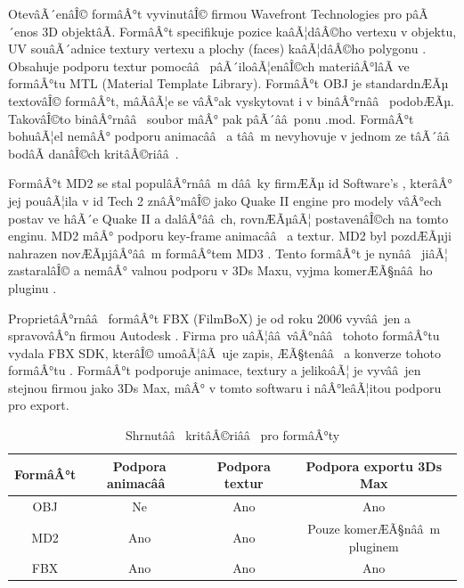 \documentclass[twoside,12pt]{article}
\begin{document}
OtevâÃ´enâÎ© formâÂ°t vyvinutâÎ© firmou Wavefront Technologies pro pâÃ´enos 3D objektâÃ. FormâÂ°t specifikuje pozice kaâÃ¦dâÂ©ho vertexu v objektu, UV souâÃ´adnice textury vertexu a plochy (faces) kaâÃ¦dâÂ©ho polygonu \cite{obj_wiki}. Obsahuje podporu textur pomocââ  pâÃ´iloâÃ¦enâÎ©ch materiâÂ°lâÃ ve formâÂ°tu MTL (Material Template Library). FormâÂ°t OBJ je standardnÆÃµ textovâÎ© formâÂ°t, mâÃâÃ¦e se vâÂ°ak vyskytovat i v binâÂ°rnââ  podobÆÃµ. TakovâÎ©to binâÂ°rnââ  soubor mâÂ° pak pâÃ´ââ ponu .mod. FormâÂ°t bohuâÃ¦el nemâÂ° podporu animacââ  \cite{obj_doc} a tââ m nevyhovuje v jednom ze tâÃ´ââ  bodâÃ danâÎ©ch kritâÂ©riââ .

FormâÂ°t MD2 se stal populâÂ°rnââ m dââ ky firmÆÃµ id Software's \cite{md2_wiki}, kterâÂ° jej pouâÃ¦ila v id Tech 2 znâÂ°mâÎ© jako Quake II engine \cite{quake_engine} pro modely vâÂ°ech postav ve hâÃ´e Quake II a dalâÂ°ââ ch, rovnÆÃµâÃ¦ postavenâÎ©ch na tomto enginu. MD2 mâÂ° podporu key-frame animacââ  a textur. MD2 byl pozdÆÃµji nahrazen novÆÃµjâÂ°ââ m formâÂ°tem MD3 \cite{id_tech_3_wiki}. Tento formâÂ°t je nynââ  jiâÃ¦ zastaralâÎ© a nemâÂ° valnou podporu v 3Ds Maxu, vyjma komerÆÃ§nââ ho pluginu \cite{qtip_plugin}. 

ProprietâÂ°rnââ  formâÂ°t FBX (FilmBoX) je od roku 2006 vyvââ jen a spravovâÂ°n firmou Autodesk \cite{autodesk_fbx}. Firma pro uâÃ¦ââ vâÂ°nââ  tohoto formâÂ°tu vydala FBX SDK, kterâÎ© umoâÃ¦âÃ uje zapis, ÆÃ§tenââ  a konverze tohoto formâÂ°tu \cite{autodesk_fbx_sdk}. FormâÂ°t podporuje animace, textury a jelikoâÃ¦ je vyvââ jen stejnou firmou jako 3Ds Max, mâÂ° v tomto softwaru i nâÂ°leâÃ¦itou podporu pro export.


\begin{table}[H]
\centering
\begin{tabular}{|c|c|c|c|}
\hline
FormâÂ°t & Podpora animacââ  & Podpora textur & Podpora exportu 3Ds Max  \\ \hline
OBJ    & Ne              & Ano            & Ano                      \\ \hline
MD2    & Ano             & Ano            & Pouze komerÆÃ§nââ m pluginem \\ \hline
FBX    & Ano             & Ano            & Ano                      \\ \hline
\end{tabular}
\caption{Shrnutââ  kritâÂ©riââ  pro formâÂ°ty}
\end{table}
\end{document}

